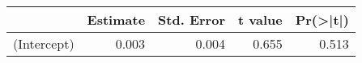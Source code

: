 
\begin{tabular}{l|r|r|r|r}
\hline
  & Estimate & Std. Error & t value & Pr(>|t|)\\
\hline
(Intercept) & 0.003 & 0.004 & 0.655 & 0.513\\
\hline
\end{tabular}
